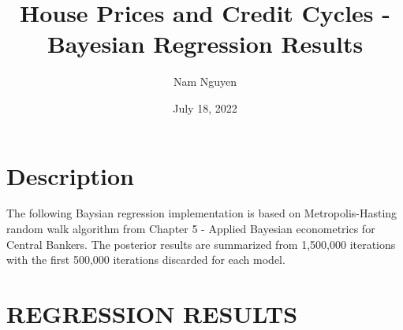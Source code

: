 \documentclass[
  12pt,
]{article}
\title{House Prices and Credit Cycles - Bayesian Regression Results}
\author{Nam Nguyen}
\date{July 18, 2022}
\begin{document}
\maketitle

\hypertarget{description}{%
\section{Description}\label{description}}

The following Baysian regression implementation is based on Metropolis-Hasting random walk algorithm from Chapter 5 - Applied Bayesian econometrics for Central Bankers. The posterior results are summarized from 1,500,000 iterations with the first 500,000 iterations discarded for each model.

\hypertarget{regression-results}{%
\section{REGRESSION RESULTS}\label{regression-results}}
\end{document}
